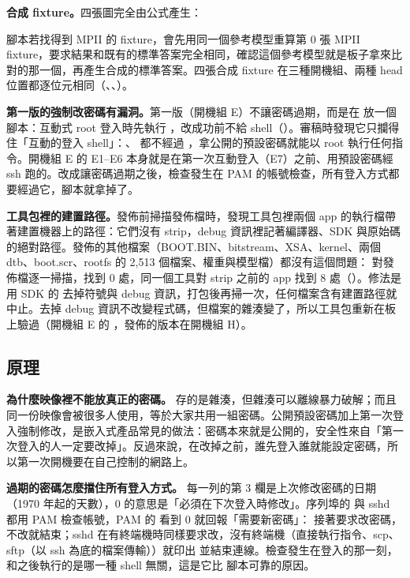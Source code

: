 \textbf{合成 fixture。}四張圖完全由公式產生：


腳本若找得到 MPII 的 fixture，會先用同一個參考模型重算第 0 張 MPII fixture，要求結果和既有的標準答案完全相同，確認這個參考模型就是板子拿來比對的那一個，再產生合成的標準答案。四張合成 fixture 在三種開機組、兩種 head 位置都逐位元相同（、、）。

\begin{pit}
\textbf{第一版的強制改密碼有漏洞。}第一版（開機組 E）不讓密碼過期，而是在  放一個腳本：互動式 root 登入時先執行 ，改成功前不給 shell（）。審稿時發現它只攔得住「互動的登入 shell」：、 都不經過 ，拿公開的預設密碼就能以 root 執行任何指令。開機組 E 的 E1--E6 本身就是在第一次互動登入（E7）之前、用預設密碼經 ssh 跑的。改成讓密碼過期之後，檢查發生在 PAM 的帳號檢查，所有登入方式都要經過它，腳本就拿掉了。
\end{pit}

\begin{pit}
\textbf{工具包裡的建置路徑。}發佈前掃描發佈檔時，發現工具包裡兩個 app 的執行檔帶著建置機器上的路徑：它們沒有 strip，debug 資訊裡記著編譯器、SDK 與原始碼的絕對路徑。發佈的其他檔案（BOOT.BIN、bitstream、XSA、kernel、兩個 dtb、boot.scr、rootfs 的 2,513 個檔案、權重與模型檔）都沒有這個問題： 對發佈檔逐一掃描，找到 0 處，同一個工具對 strip 之前的 app 找到 8 處（）。修法是  用 SDK 的  去掉符號與 debug 資訊，打包後再掃一次，任何檔案含有建置路徑就中止。去掉 debug 資訊不改變程式碼，但檔案的雜湊變了，所以工具包重新在板上驗過（開機組 E 的 ，發佈的版本在開機組 H）。
\end{pit}

\subsection{原理}

\textbf{為什麼映像裡不能放真正的密碼。} 存的是雜湊，但雜湊可以離線暴力破解；而且同一份映像會被很多人使用，等於大家共用一組密碼。公開預設密碼加上第一次登入強制修改，是嵌入式產品常見的做法：密碼本來就是公開的，安全性來自「第一次登入的人一定要改掉」。反過來說，在改掉之前，誰先登入誰就能設定密碼，所以第一次開機要在自己控制的網路上。

\textbf{過期的密碼怎麼擋住所有登入方式。} 每一列的第 3 欄是上次修改密碼的日期（1970 年起的天數），0 的意思是「必須在下次登入時修改」。序列埠的  與 sshd 都用 PAM 檢查帳號，PAM 的  看到 0 就回報「需要新密碼」： 接著要求改密碼，不改就結束；sshd 在有終端機時同樣要求改，沒有終端機（直接執行指令、scp、sftp（以 ssh 為底的檔案傳輸））就印出  並結束連線。檢查發生在登入的那一刻，和之後執行的是哪一種 shell 無關，這是它比  腳本可靠的原因。

